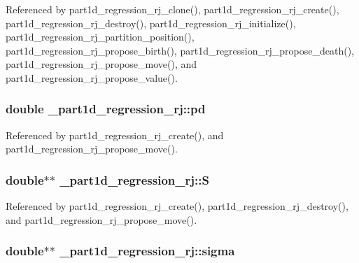 Referenced by part1d\+\_\+regression\+\_\+rj\+\_\+clone(), part1d\+\_\+regression\+\_\+rj\+\_\+create(), part1d\+\_\+regression\+\_\+rj\+\_\+destroy(), part1d\+\_\+regression\+\_\+rj\+\_\+initialize(), part1d\+\_\+regression\+\_\+rj\+\_\+partition\+\_\+position(), part1d\+\_\+regression\+\_\+rj\+\_\+propose\+\_\+birth(), part1d\+\_\+regression\+\_\+rj\+\_\+propose\+\_\+death(), part1d\+\_\+regression\+\_\+rj\+\_\+propose\+\_\+move(), and part1d\+\_\+regression\+\_\+rj\+\_\+propose\+\_\+value().

\subsubsection[{\texorpdfstring{pd}{pd}}]{\setlength{\rightskip}{0pt plus 5cm}double \+\_\+part1d\+\_\+regression\+\_\+rj\+::pd}\hypertarget{struct__part1d__regression__rj_a897d04d7b96f172934bba3e707135eab}{}\label{struct__part1d__regression__rj_a897d04d7b96f172934bba3e707135eab}


Referenced by part1d\+\_\+regression\+\_\+rj\+\_\+create(), and part1d\+\_\+regression\+\_\+rj\+\_\+propose\+\_\+move().

\subsubsection[{\texorpdfstring{S}{S}}]{\setlength{\rightskip}{0pt plus 5cm}double$\ast$$\ast$ \+\_\+part1d\+\_\+regression\+\_\+rj\+::S}\hypertarget{struct__part1d__regression__rj_aa8816e62847a9287c933a7f481eaa256}{}\label{struct__part1d__regression__rj_aa8816e62847a9287c933a7f481eaa256}


Referenced by part1d\+\_\+regression\+\_\+rj\+\_\+create(), part1d\+\_\+regression\+\_\+rj\+\_\+destroy(), and part1d\+\_\+regression\+\_\+rj\+\_\+propose\+\_\+move().

\subsubsection[{\texorpdfstring{sigma}{sigma}}]{\setlength{\rightskip}{0pt plus 5cm}double$\ast$$\ast$ \+\_\+part1d\+\_\+regression\+\_\+rj\+::sigma}\hypertarget{struct__part1d__regression__rj_ac8e269e5f35a939eff981f59a5c00724}{}\label{struct__part1d__regression__rj_ac8e269e5f35a939eff981f59a5c00724}


